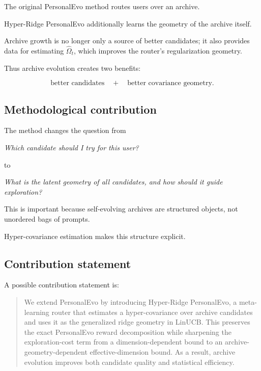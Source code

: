 \documentclass{article} %
\begin{document}
The original PersonalEvo method routes users over an archive.

Hyper-Ridge
PersonalEvo additionally learns the geometry of the archive itself.

Archive
growth is no longer only a source of better candidates; it also provides data
for estimating $\widehat{\Omega}_t$, which improves the router's
regularization geometry.

Thus archive evolution creates two benefits:

\[
\text{better candidates} \quad + \quad \text{better covariance geometry}.
\]



\subsection{Methodological contribution}

The method changes the question from

\begin{center}
\emph{Which candidate should I try for this user?}
\end{center}

to

\begin{center}
\emph{What is the latent geometry of all candidates, and how should it guide
exploration?}
\end{center}

This is important because self-evolving archives are structured objects, not
unordered bags of prompts.

Hyper-covariance estimation makes this structure
explicit.

\subsection{Contribution statement}

A possible contribution statement is:

\begin{quote}
We extend PersonalEvo by introducing Hyper-Ridge PersonalEvo, a meta-learning
router that estimates a hyper-covariance over archive candidates and uses it
as the generalized ridge geometry in LinUCB. This preserves the exact
PersonalEvo reward decomposition while sharpening the exploration-cost term
from a dimension-dependent bound to an archive-geometry-dependent
effective-dimension bound. As a result, archive evolution improves both
candidate quality and statistical efficiency.
\end{quote}
\end{document}
